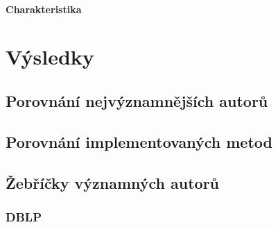 \documentclass[12pt,titlepage]{report}
\begin{document}
\subsubsection{Charakteristika}


\chapter{Výsledky}
\section{Porovnání nejvýznamnějších autorů}
\section{Porovnání implementovaných metod}

\section{Žebříčky významných autorů}
\subsection{DBLP}
\end{document}
